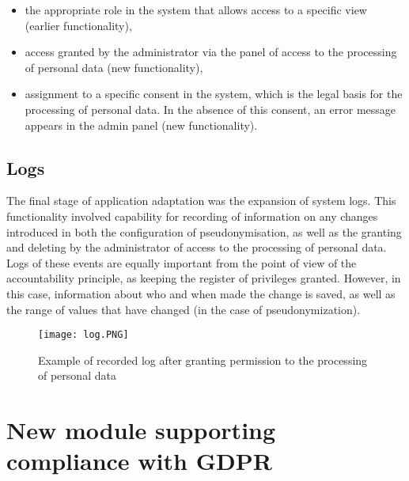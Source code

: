 \documentclass[en, noamssymb]{mgr}
\begin{document}
\begin{itemize}

\item the appropriate role in the system that allows access to a specific view (earlier functionality),
\item access granted by the administrator via the panel of access to the processing of personal data (new functionality),
\item assignment to a specific consent in the system, which is the legal basis for the processing of personal data. In the absence of this consent, an error message appears in the admin panel (new functionality).

\end{itemize}


\subsection{Logs}

The final stage of application adaptation was the expansion of system logs. This functionality involved capability for recording of information on any changes introduced in both the configuration of pseudonymisation, as well as the granting and deleting by the administrator of access to the processing of personal data. Logs of these events are equally important from the point of view of the accountability principle, as keeping the register of privileges granted. However, in this case, information about who and when made the change is saved, as well as the range of values that have changed (in the case of pseudonymization). 

\begin{figure}[H]
	\centering
	\texttt{[image: log.PNG]}
	\caption[Example of recorded log after granting permission to the processing of personal data]{Example of recorded log after granting permission to the processing of personal data}
	\label{fig:Logs}
\end{figure}

\section{New module supporting compliance with GDPR}
 
\end{document}
